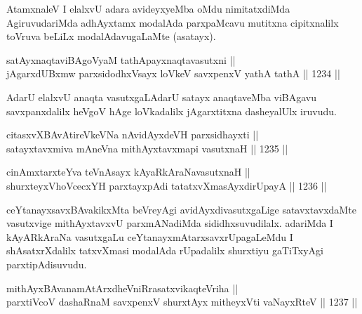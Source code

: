 \begin{artha}
AtamxnaleV I elalxvU adara avideyxyeMba oMdu nimitatxdiMda AgiruvudariMda adhAyxtamx modalAda parxpaMcavu mutitxna cipitxnalilx toVruva beLiLx modalAdavugaLaMte (asatayx).
\end{artha}


\begin{shl}
satAyxnaqtaviBAgoV\s yaM tathA\s payxnaqtavasutxni || \\
jAgarxdUBxmw parxsidodhxV\s sayx loVkeV savxpenxV yathA tathA \hfill || 1234 ||  
\end{shl}

\begin{artha}
AdarU elalxvU anaqta vasutxgaLAdarU satayx anaqtaveMba viBAgavu savxpanxdalilx heVgoV hAge loVkadalilx jAgarxtitxna dasheyalUlx iruvudu.
\end{artha}

\begin{shl}
citasxvXBAvAtireVkeVNa nAvidAyxdeVH parxsidhayxti || \\
satayxtavxmiva mAneVna mithAyxtavxmapi vasutxnaH \hfill || 1235 ||  
\end{shl}
				
\begin{shl}
cinAmxtarxteYva teVnAsayx kAyaRkAraNavasutxnaH || \\
shurxteyxVhoVcecxYH parxtayxpAdi tatatxvXmasAyxdirUpayA \hfill || 1236 ||  
\end{shl}

\begin{artha}
ceYtanayxsavxBAvakikxMta beVreyAgi avidAyxdivasutxgaLige satavxtavxdaMte vasutxvige mithAyxtavxvU parxmANadiMda sididhxsuvudilalx. adariMda I kAyARkAraNa vasutxgaLu ceYtanayxmAtarxsavxrUpagaLeMdu I shAsatxrXdalilx tatxvXmasi modalAda rUpadalilx shurxtiyu gaTiTxyAgi parxtipAdisuvudu.
\end{artha}


\begin{shl}
mithAyxBAvanamAtArxdheVniRrasatxvikaqteVriha || \\
parxtiVcoV dashaRnaM savxpenxV shurxtAyx mitheyxVti vaNayxRteV \hfill || 1237 ||  
\end{shl}

